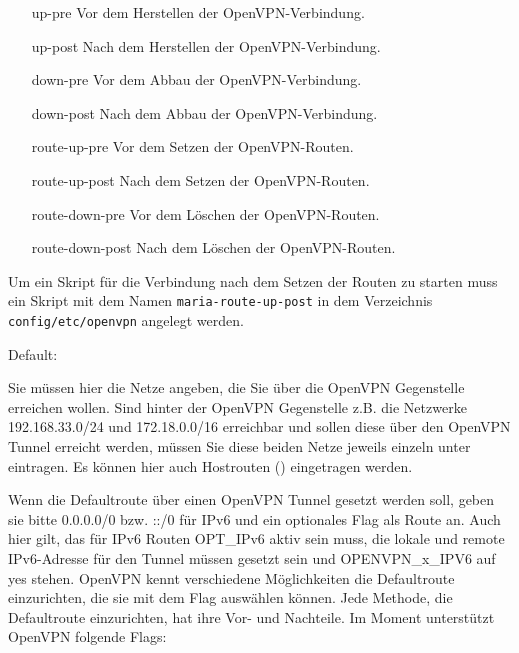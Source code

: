 \begin{description}
  \begin{itemize}
    \item [up-pre] Vor dem Herstellen der OpenVPN-Verbindung.
    \item [up-post] Nach dem Herstellen der OpenVPN-Verbindung.
    \item [down-pre] Vor dem Abbau der OpenVPN-Verbindung.
    \item [down-post] Nach dem Abbau der OpenVPN-Verbindung.
    \item [route-up-pre] Vor dem Setzen der OpenVPN-Routen.
    \item [route-up-post] Nach dem Setzen der OpenVPN-Routen.
    \item [route-down-pre] Vor dem Löschen der OpenVPN-Routen.
    \item [route-down-post] Nach dem Löschen der OpenVPN-Routen.
  \end{itemize}

  Um ein Skript für die Verbindung  nach
  dem Setzen der Routen zu starten muss ein Skript mit dem
  Namen \texttt{maria-route-up-post} in dem
  Verzeichnis \texttt{config/etc/openvpn} angelegt werden.


  Default: 

  Sie müssen hier die Netze angeben, die Sie über die OpenVPN
  Gegenstelle erreichen wollen. Sind hinter der OpenVPN Gegenstelle
  z.B. die Netzwerke 192.168.33.0/24 und 172.18.0.0/16 erreichbar und
  sollen diese über den OpenVPN Tunnel erreicht werden, müssen Sie
  diese beiden Netze jeweils einzeln unter 
  eintragen. Es können hier auch Hostrouten () eingetragen
  werden.

  Wenn die Defaultroute über einen OpenVPN Tunnel gesetzt werden soll,
  geben sie bitte 0.0.0.0/0 bzw. ::/0 für IPv6 und ein 
  optionales Flag als Route an. Auch hier gilt, das für IPv6 Routen OPT\_IPv6 
  aktiv sein muss, die lokale und remote IPv6-Adresse für den Tunnel müssen gesetzt 
  sein und OPENVPN\_x\_IPV6 auf yes stehen. OpenVPN kennt verschiedene Möglichkeiten 
  die Defaultroute einzurichten, die sie mit dem Flag auswählen können. 
  Jede Methode, die Defaultroute einzurichten, hat ihre Vor- und Nachteile. 
  Im Moment unterstützt OpenVPN folgende Flags:


\end{description}

